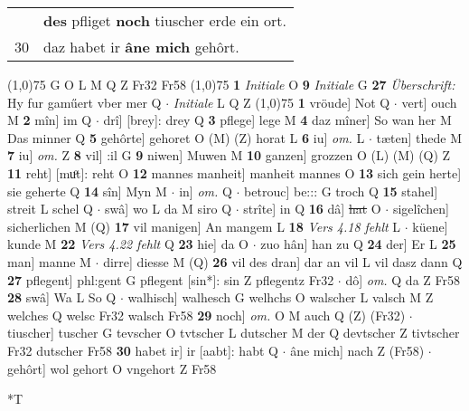 \documentclass[8pt,a4paper,notitlepage]{article}
\begin{document}
\begin{table}[ht]
\begin{minipage}[t]{0.5\linewidth}
\begin{tabular}{rl}
 & \textbf{des} pfliget \textbf{noch} tiuscher erde ein ort.\\ 
30 & daz habet ir \textbf{âne mich} gehôrt.\\ 
\end{tabular}
\scriptsize
\line(1,0){75} \newline
G O L M Q Z Fr32 Fr58 \newline
\line(1,0){75} \newline
\textbf{1} \textit{Initiale} O  \textbf{9} \textit{Initiale} G  \textbf{27} \textit{Überschrift:} Hy fur gaműert vber mer Q   $\cdot$ \textit{Initiale} L Q Z  \newline
\line(1,0){75} \newline
\textbf{1} vröude] Not Q  $\cdot$ vert] ouch M \textbf{2} mîn] im Q  $\cdot$ drî] [brey]: drey Q \textbf{3} pflege] lege M \textbf{4} daz mîner] So wan her M Das minner Q \textbf{5} gehôrte] gehoret O (M) (Z) horat L \textbf{6} iu] \textit{om.} L  $\cdot$ tæten] thede M \textbf{7} iu] \textit{om.} Z \textbf{8} vil] :il G \textbf{9} niwen] Muwen M \textbf{10} ganzen] grozzen O (L) (M) (Q) Z \textbf{11} reht] [muͦt]: reht O \textbf{12} mannes manheit] manheit mannes O \textbf{13} sich gein herte] sie geherte Q \textbf{14} sîn] Myn M  $\cdot$ in] \textit{om.} Q  $\cdot$ betrouc] be::: G troch Q \textbf{15} stahel] streit L schel Q  $\cdot$ swâ] wo L da M siro Q  $\cdot$ strîte] in Q \textbf{16} dâ] \sout{hat} O  $\cdot$ sigelîchen] sicherlichen M (Q) \textbf{17} vil manigen] An mangem L \textbf{18} \textit{Vers 4.18 fehlt} L   $\cdot$ küene] kunde M \textbf{22} \textit{Vers 4.22 fehlt} Q  \textbf{23} hie] da O  $\cdot$ zuo hân] han zu Q \textbf{24} der] Er L \textbf{25} man] manne M  $\cdot$ dirre] diesse M (Q) \textbf{26} vil des dran] dar an vil L vil dasz dann Q \textbf{27} pflegent] phl:gent G pflegent [sin*]: sin Z pflegentz Fr32  $\cdot$ dô] \textit{om.} Q da Z Fr58 \textbf{28} swâ] Wa L So Q  $\cdot$ walhisch] walhesch G welhchs O walscher L valsch M Z welches Q welsc Fr32 walsch Fr58 \textbf{29} noch] \textit{om.} O M auch Q (Z) (Fr32)  $\cdot$ tiuscher] tuscher G tevscher O tvtscher L dutscher M der Q devtscher Z tivtscher Fr32 dutscher Fr58 \textbf{30} habet ir] ir [aabt]: habt Q  $\cdot$ âne mich] nach Z (Fr58)  $\cdot$ gehôrt] wol gehort O vngehort Z Fr58 \newline
\end{minipage}
\hspace{0.5cm}
\begin{minipage}[t]{0.5\linewidth}
\small
\begin{center}*T

\end{center}
\end{minipage}
\end{table}
\end{document}
